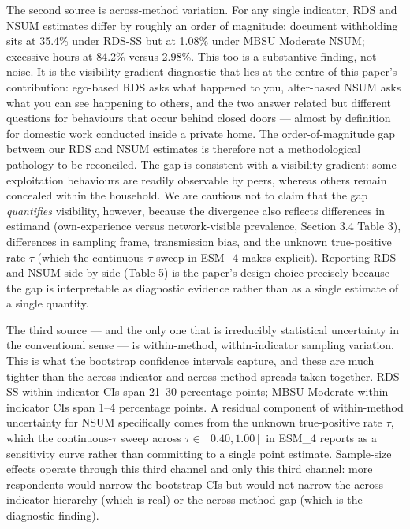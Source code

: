\documentclass[
  12pt,
  letterpaper,
  DIV=11,
  numbers=noendperiod]{scrartcl}
\begin{document}
The second source is across-method variation. For any single indicator,
RDS and NSUM estimates differ by roughly an order of magnitude: document
withholding sits at 35.4\% under RDS-SS but at 1.08\% under MBSU
Moderate NSUM; excessive hours at 84.2\% versus 2.98\%. This too is a
substantive finding, not noise. It is the visibility gradient diagnostic
that lies at the centre of this paper's contribution: ego-based RDS asks
what happened to you, alter-based NSUM asks what you can see happening
to others, and the two answer related but different questions for
behaviours that occur behind closed doors --- almost by definition for
domestic work conducted inside a private home. The order-of-magnitude
gap between our RDS and NSUM estimates is therefore not a methodological
pathology to be reconciled. The gap is consistent with a visibility
gradient: some exploitation behaviours are readily observable by peers,
whereas others remain concealed within the household. We are cautious
not to claim that the gap \emph{quantifies} visibility, however, because
the divergence also reflects differences in estimand (own-experience
versus network-visible prevalence, Section 3.4 Table 3), differences in
sampling frame, transmission bias, and the unknown true-positive rate
\(\tau\) (which the continuous-\(\tau\) sweep in ESM\_4 makes explicit).
Reporting RDS and NSUM side-by-side (Table 5) is the paper's design
choice precisely because the gap is interpretable as diagnostic evidence
rather than as a single estimate of a single quantity.

The third source --- and the only one that is irreducibly statistical
uncertainty in the conventional sense --- is within-method,
within-indicator sampling variation. This is what the bootstrap
confidence intervals capture, and these are much tighter than the
across-indicator and across-method spreads taken together. RDS-SS
within-indicator CIs span 21--30 percentage points; MBSU Moderate
within-indicator CIs span 1--4 percentage points. A residual component
of within-method uncertainty for NSUM specifically comes from the
unknown true-positive rate \(\tau\), which the continuous-\(\tau\) sweep
across \(\tau \in [0.40, 1.00]\) in ESM\_4 reports as a sensitivity
curve rather than committing to a single point estimate. Sample-size
effects operate through this third channel and only this third channel:
more respondents would narrow the bootstrap CIs but would not narrow the
across-indicator hierarchy (which is real) or the across-method gap
(which is the diagnostic finding).
\end{document}
